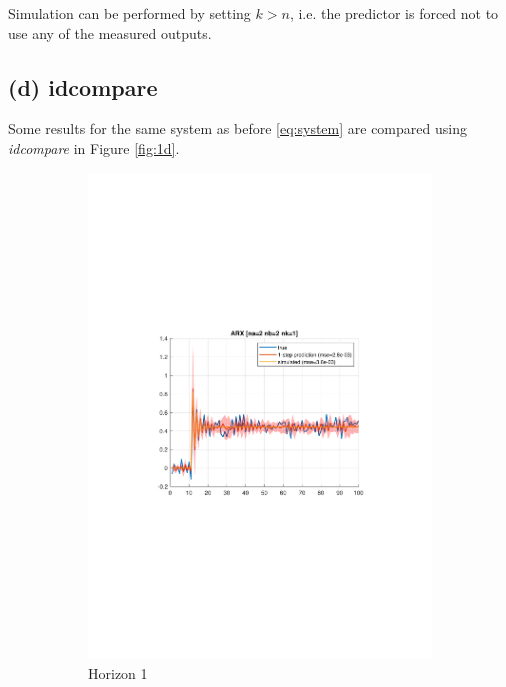 \documentclass[]{article}
\begin{document}
Simulation can be performed by setting $k > n$, i.e. the predictor is forced not to use any of the measured outputs. 

\subsection{(d) idcompare}
Some results for the same system as before \eqref{eq:system} are compared using \emph{idcompare} in Figure \ref{fig:1d}.
\begin{figure}[ht]
\centering
\begin{subfigure}{.30\textwidth}
	\centering
	\includegraphics[trim= 10cm 8cm 10cm 8cm, scale=0.3]{figures/1d-horizon_1.pdf}
	\caption{Horizon 1}
	\label{fig:1d-horizon1}
\end{subfigure}
\begin{subfigure}{.30\textwidth}
	\centering

\end{subfigure}
\end{figure}
\end{document}
